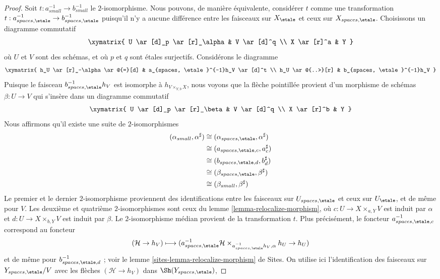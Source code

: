 \begin{proof}
Soit $t : a_{small}^{-1} \to b_{small}^{-1}$ le $2$-isomorphisme.
Nous pouvons, de manière équivalente, considérer $t$ comme une transformation
$t : a_{spaces, \etale}^{-1} \to b_{spaces, \etale}^{-1}$
puisqu'il n'y a aucune différence entre les faisceaux sur $X_\etale$
et ceux sur $X_{spaces, \etale}$.
Choisissons un diagramme commutatif
$$
\xymatrix{
U \ar[d]_p \ar[r]_\alpha  & V \ar[d]^q \\
X \ar[r]^a & Y
}
$$
où $U$ et $V$ sont des schémas, et où $p$ et $q$ sont \'etales surjectifs.
Considérons le diagramme
$$
\xymatrix{
h_U \ar[r]_-\alpha \ar@{=}[d] & a_{spaces, \etale}^{-1}h_V \ar[d]^t \\
h_U \ar@{..>}[r] & b_{spaces, \etale}^{-1}h_V
}
$$
Puisque le faisceau $b_{spaces, \etale}^{-1}h_V$ est isomorphe à
$h_{V \times_{Y, b} X}$, nous voyons que la flèche pointillée provient d'un
morphisme de schémas
$\beta : U \to V$ qui s'insère dans un diagramme commutatif
$$
\xymatrix{
U \ar[d]_p \ar[r]_\beta  & V \ar[d]^q \\
X \ar[r]^b & Y
}
$$
Nous affirmons qu'il existe une suite de $2$-isomorphismes
\begin{align*}
(\alpha_{small}, \alpha^\sharp)
& \cong
(\alpha_{spaces, \etale}, \alpha^\sharp) \\
& \cong
(a_{spaces, \etale, c}, a_c^\sharp) \\
& \cong
(b_{spaces, \etale, d}, b_d^\sharp) \\
& \cong
(\beta_{spaces, \etale}, \beta^\sharp) \\
& \cong
(\beta_{small}, \beta^\sharp)
\end{align*}
Le premier et le dernier $2$-isomorphisme proviennent des identifications
entre les faisceaux sur $U_{spaces, \etale}$ et ceux sur
$U_\etale$, et de même pour $V$. Les deuxième et quatrième
$2$-isomorphismes sont ceux du
lemme \ref{lemma-relocalize-morphism},
où $c : U \to X \times_{a, Y} V$ est induit par $\alpha$ et
$d : U \to X \times_{b, Y} V$ est induit par $\beta$.
Le $2$-isomorphisme médian provient de la transformation $t$.
Plus précisément, le foncteur $a_{spaces, \etale, c}^{-1}$ correspond
au foncteur
$$
(\mathcal{H} \to h_V) \longmapsto
(a_{spaces, \etale}^{-1}\mathcal{H}
\times_{a_{spaces, \etale}^{-1}h_V, \alpha}
h_U \to
h_U)
$$
et de même pour $b_{spaces, \etale, d}^{-1}$ ; voir le
lemme \ref{sites-lemma-relocalize-morphism} de Sites.
On utilise ici l'identification des faisceaux sur $Y_{spaces, \etale}/V$
avec les flèches $(\mathcal{H} \to h_V)$ dans $\Sh(Y_{spaces, \etale})$,

\end{proof}
